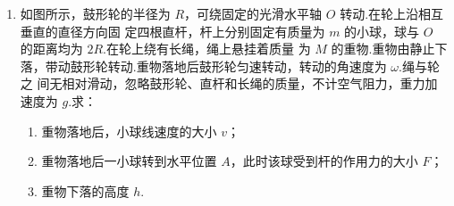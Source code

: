 \begin{enumerate}
\begin{enumerate}
\end{enumerate}
\begin{figure}[h!]
\flushright

\end{figure}






\item
如图所示，鼓形轮的半径为 $ R $，可绕固定的光滑水平轴 $ O $ 转动.在轮上沿相互垂直的直径方向固
定四根直杆，杆上分别固定有质量为 $ m $ 的小球，球与 $ O $ 的距离均为 $ 2R $.在轮上绕有长绳，绳上悬挂着质量
为 $ M $ 的重物.重物由静止下落，带动鼓形轮转动.重物落地后鼓形轮匀速转动，转动的角速度为 $ \omega $.绳与轮之
间无相对滑动，忽略鼓形轮、直杆和长绳的质量，不计空气阻力，重力加速度为 $ g $.求：
\begin{enumerate}
\item
重物落地后，小球线速度的大小 $ v $；
\item 
重物落地后一小球转到水平位置 $ A $，此时该球受到杆的作用力的大小 $ F $；
\item 
重物下落的高度 $ h $.
\end{enumerate}
\begin{figure}[h!]
\flushright

\end{figure}









\newpage


\end{enumerate}
